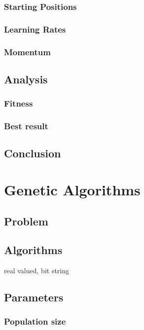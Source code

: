 \documentclass{scrartcl}
\begin{document}
\subsubsection{Starting Positions}
\subsubsection{Learning Rates}
\subsubsection{Momentum}

\subsection{Analysis}

\subsubsection{Fitness}

\subsubsection{Best result}

\subsection{Conclusion}



\section{Genetic Algorithms}

\subsection{Problem}

\subsection{Algorithms}
real valued, bit string

\subsection{Parameters}
\subsubsection{Population size}
\end{document}
